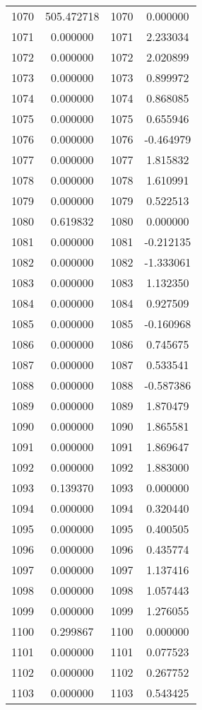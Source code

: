 \documentclass[12pt]{article}
\begin{document}
\begin{longtable}{@{}cccc@{}}
1070 & 505.472718 & 1070 & 0.000000 \\
1071 & 0.000000 & 1071 & 2.233034 \\
1072 & 0.000000 & 1072 & 2.020899 \\
1073 & 0.000000 & 1073 & 0.899972 \\
1074 & 0.000000 & 1074 & 0.868085 \\
1075 & 0.000000 & 1075 & 0.655946 \\
1076 & 0.000000 & 1076 & -0.464979 \\
1077 & 0.000000 & 1077 & 1.815832 \\
1078 & 0.000000 & 1078 & 1.610991 \\
1079 & 0.000000 & 1079 & 0.522513 \\
1080 & 0.619832 & 1080 & 0.000000 \\
1081 & 0.000000 & 1081 & -0.212135 \\
1082 & 0.000000 & 1082 & -1.333061 \\
1083 & 0.000000 & 1083 & 1.132350 \\
1084 & 0.000000 & 1084 & 0.927509 \\
1085 & 0.000000 & 1085 & -0.160968 \\
1086 & 0.000000 & 1086 & 0.745675 \\
1087 & 0.000000 & 1087 & 0.533541 \\
1088 & 0.000000 & 1088 & -0.587386 \\
1089 & 0.000000 & 1089 & 1.870479 \\
1090 & 0.000000 & 1090 & 1.865581 \\
1091 & 0.000000 & 1091 & 1.869647 \\
1092 & 0.000000 & 1092 & 1.883000 \\
1093 & 0.139370 & 1093 & 0.000000 \\
1094 & 0.000000 & 1094 & 0.320440 \\
1095 & 0.000000 & 1095 & 0.400505 \\
1096 & 0.000000 & 1096 & 0.435774 \\
1097 & 0.000000 & 1097 & 1.137416 \\
1098 & 0.000000 & 1098 & 1.057443 \\
1099 & 0.000000 & 1099 & 1.276055 \\
1100 & 0.299867 & 1100 & 0.000000 \\
1101 & 0.000000 & 1101 & 0.077523 \\
1102 & 0.000000 & 1102 & 0.267752 \\
1103 & 0.000000 & 1103 & 0.543425 \\

\end{longtable}
\end{document}
